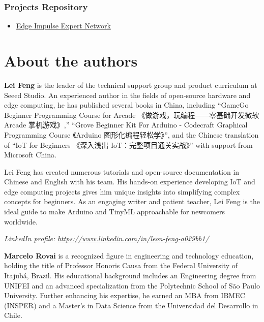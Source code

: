 \documentclass[
  letterpaper,
  DIV=11,
  numbers=noendperiod]{scrreprt}
\providecommand{\tightlist}{%
  \setlength{\itemsep}{0pt}\setlength{\parskip}{0pt}}\usepackage{longtable,booktabs,array}
\begin{document}
\hypertarget{projects-repository}{%
\subsection*{Projects Repository}\label{projects-repository}}

\begin{itemize}
\tightlist
\item
  \href{https://docs.edgeimpulse.com/experts/}{Edge Impulse Expert
  Network}
\end{itemize}


\hypertarget{about-the-authors}{%
\chapter*{About the authors}\label{about-the-authors}}


\textbf{Lei Feng} is the leader of the technical support group and
product curriculum at Seeed Studio. An experienced author in the fields
of open-source hardware and edge computing, he has published several
books in China, including ``GameGo Beginner Programming Course for
Arcade 《做游戏，玩编程------零基础开发微软 Arcade 掌机游戏》,'' ``Grove
Beginner Kit For Arduino - Codecraft Graphical Programming Course
《Arduino 图形化编程轻松学》'', and the Chinese translation of ``IoT for
Beginners 《深入浅出 IoT：完整项目通关实战》'' with support from
Microsoft China.

Lei Feng has created numerous tutorials and open-source documentation in
Chinese and English with his team. His hands-on experience developing
IoT and edge computing projects gives him unique insights into
simplifying complex concepts for beginners. As an engaging writer and
patient teacher, Lei Feng is the ideal guide to make Arduino and TinyML
approachable for newcomers worldwide.

\emph{LinkedIn profile:}
\href{https://www.linkedin.com/in/leon-feng-a029bb1/}{\emph{https://www.linkedin.com/in/leon-feng-a029bb1/}}

\textbf{Marcelo Rovai} is a recognized figure in engineering and
technology education, holding the title of Professor Honoris Causa from
the Federal University of Itajubá, Brazil. His educational background
includes an Engineering degree from UNIFEI and an advanced
specialization from the Polytechnic School of São Paulo University.
Further enhancing his expertise, he earned an MBA from IBMEC (INSPER)
and a Master's in Data Science from the Universidad del Desarrollo in
Chile.
\end{document}
